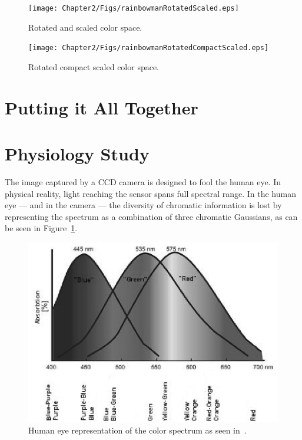 \begin{figure}[h!]
  \caption{Rotated and scaled color space.}
  \centering
    \texttt{[image: Chapter2/Figs/rainbowmanRotatedScaled.eps]}
\end{figure}

\begin{figure}[h!]
  \caption{Rotated compact scaled color space.}
  \centering
    \texttt{[image: Chapter2/Figs/rainbowmanRotatedCompactScaled.eps]}
\end{figure}

\section{Putting it All Together}\label{sec:PuttingItAllTogether}

\section{Physiology Study}\label{sec:PhysiologyStudy}

The image captured by a CCD camera is designed to fool the human eye. In physical reality, light reaching the sensor spans full spectral range. In the human eye --- and in the camera --- the diversity of chromatic information is lost by representing the spectrum as a combination of three chromatic Gaussians, as can be seen in Figure~\ref{fig:spectrum}.

\begin{figure}[h!]
  \caption{Human eye representation of the color spectrum as seen in~\cite{MIHAI2007}.}\label{fig:spectrum}
  \centering
    \includegraphics[width=\textwidth]{Chapter2/Figs/spectrum.eps}
\end{figure}

